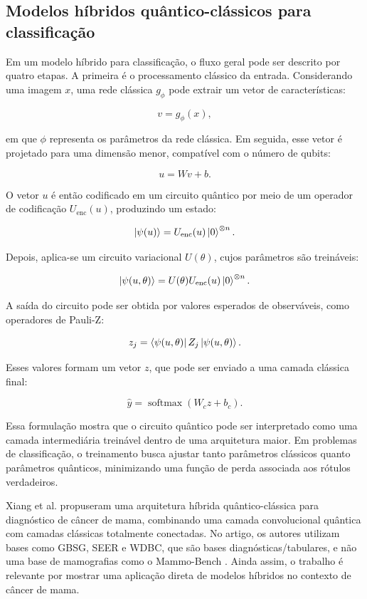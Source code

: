 \documentclass[
    12pt,
    openright,
    oneside,
    a4paper,
    english,
    brazil
]{abntex2}
\begin{document}
\subsection{Modelos híbridos quântico-clássicos para classificação}

Em um modelo híbrido para classificação, o fluxo geral pode ser descrito por quatro etapas. A primeira é o processamento clássico da entrada. Considerando uma imagem \(x\), uma rede clássica \(g_{\phi}\) pode extrair um vetor de características:

\[
v = g_{\phi}(x),
\]

em que \(\phi\) representa os parâmetros da rede clássica. Em seguida, esse vetor é projetado para uma dimensão menor, compatível com o número de qubits:

\[
u = Wv + b.
\]

O vetor \(u\) é então codificado em um circuito quântico por meio de um operador de codificação \(U_{\text{enc}}(u)\), produzindo um estado:

\[
\ket{\psi(u)}
=
U_{\text{enc}}(u)
\ket{0}^{\otimes n}.
\]

Depois, aplica-se um circuito variacional \(U(\theta)\), cujos parâmetros são treináveis:

\[
\ket{\psi(u,\theta)}
=
U(\theta)
U_{\text{enc}}(u)
\ket{0}^{\otimes n}.
\]

A saída do circuito pode ser obtida por valores esperados de observáveis, como operadores de Pauli-Z:

\[
z_j =
\bra{\psi(u,\theta)}
Z_j
\ket{\psi(u,\theta)}.
\]

Esses valores formam um vetor \(z\), que pode ser enviado a uma camada clássica final:

\[
\hat{y}
=
\operatorname{softmax}(W_c z + b_c).
\]

Essa formulação mostra que o circuito quântico pode ser interpretado como uma camada intermediária treinável dentro de uma arquitetura maior. Em problemas de classificação, o treinamento busca ajustar tanto parâmetros clássicos quanto parâmetros quânticos, minimizando uma função de perda associada aos rótulos verdadeiros.

Xiang et al. propuseram uma arquitetura híbrida quântico-clássica para diagnóstico de câncer de mama, combinando uma camada convolucional quântica com camadas clássicas totalmente conectadas. No artigo, os autores utilizam bases como GBSG, SEER e WDBC, que são bases diagnósticas/tabulares, e não uma base de mamografias como o Mammo-Bench \cite{xiang2024qccnn}. Ainda assim, o trabalho é relevante por mostrar uma aplicação direta de modelos híbridos no contexto de câncer de mama.
\end{document}
